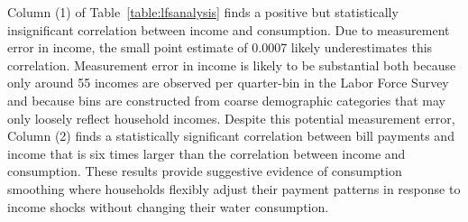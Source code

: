 \documentclass[12pt,table]{article}
\begin{document}
Column (1) of Table~\ref{table:lfsanalysis} finds a positive but statistically insignificant correlation between income and consumption.  Due to measurement error in income, the small point estimate of 0.0007 likely underestimates this correlation.  Measurement error in income is likely to be substantial both because only around 55 incomes are observed per quarter-bin in the Labor Force Survey and because bins are constructed from coarse demographic categories that may only loosely reflect household incomes.  Despite this potential measurement error, Column (2) finds a statistically significant correlation between bill payments and income that is six times larger than the correlation between income and consumption.  These results provide suggestive evidence of consumption smoothing where households flexibly adjust their payment patterns in response to income shocks without changing their water consumption.  


\end{document}
